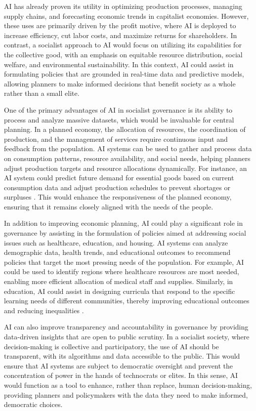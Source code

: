 \begin{refsection}
AI has already proven its utility in optimizing production processes, managing supply chains, and forecasting economic trends in capitalist economies. However, these uses are primarily driven by the profit motive, where AI is deployed to increase efficiency, cut labor costs, and maximize returns for shareholders. In contrast, a socialist approach to AI would focus on utilizing its capabilities for the collective good, with an emphasis on equitable resource distribution, social welfare, and environmental sustainability. In this context, AI could assist in formulating policies that are grounded in real-time data and predictive models, allowing planners to make informed decisions that benefit society as a whole rather than a small elite.

One of the primary advantages of AI in socialist governance is its ability to process and analyze massive datasets, which would be invaluable for central planning. In a planned economy, the allocation of resources, the coordination of production, and the management of services require continuous input and feedback from the population. AI systems can be used to gather and process data on consumption patterns, resource availability, and social needs, helping planners adjust production targets and resource allocations dynamically. For instance, an AI system could predict future demand for essential goods based on current consumption data and adjust production schedules to prevent shortages or surpluses \cite[pp.~115-120]{benjamin_ai_2019}. This would enhance the responsiveness of the planned economy, ensuring that it remains closely aligned with the needs of the people.

In addition to improving economic planning, AI could play a significant role in governance by assisting in the formulation of policies aimed at addressing social issues such as healthcare, education, and housing. AI systems can analyze demographic data, health trends, and educational outcomes to recommend policies that target the most pressing needs of the population. For example, AI could be used to identify regions where healthcare resources are most needed, enabling more efficient allocation of medical staff and supplies. Similarly, in education, AI could assist in designing curricula that respond to the specific learning needs of different communities, thereby improving educational outcomes and reducing inequalities \cite[pp.~200-205]{susskind_ai_governance}.

AI can also improve transparency and accountability in governance by providing data-driven insights that are open to public scrutiny. In a socialist society, where decision-making is collective and participatory, the use of AI should be transparent, with its algorithms and data accessible to the public. This would ensure that AI systems are subject to democratic oversight and prevent the concentration of power in the hands of technocrats or elites. In this sense, AI would function as a tool to enhance, rather than replace, human decision-making, providing planners and policymakers with the data they need to make informed, democratic choices.


\end{refsection}
